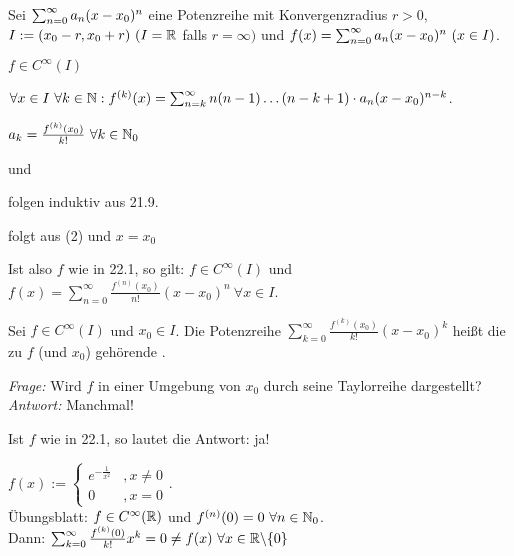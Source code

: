 \documentclass[a4paper,oneside,DIV15,BCOR12mm]{scrbook}
\begin{document}
\begin{satz}
Sei $\sum_{n=0}^{\infty}{a_n(x-x_0)^n}$ eine Potenzreihe mit Konvergenzradius $r>0$, $I:= (x_0-r,x_0+r)\ (I=\mathbb{R}$ falls $r=\infty)$ und $f(x) = \sum_{n=0}^{\infty}{a_n(x-x_0)^n}\ (x\in I)$.
\begin{liste}
\item $f\in C^\infty(I)$
\item $\forall x \in I\ \forall k\in\mathbb{N}: f^{(k)}(x) = \sum_{n=k}^\infty n(n-1)\ldots(n-k+1)\cdot a_n(x-x_0)^{n-k}$.
\item $a_k = \frac{f^{(k)}(x_0)}{k!} \ \forall k \in \mathbb{N}_0$
\end{liste}
\end{satz}

\begin{beweise}
\item und
\item folgen induktiv aus 21.9.
\item folgt aus (2) und $x=x_0$
\end{beweise}

\begin{motivation}
Ist also $f$ wie in 22.1, so gilt: $f\in C^\infty(I)$ und $f(x)=\sum_{n=0}^\infty \frac{f^{(n)}(x_0)}{n!}(x-x_0)^n \ \forall x \in I$.
\end{motivation}

\begin{definition}
Sei $f\in C^\infty(I)$ und $x_0 \in I$. Die Potenzreihe $\sum_{k=0}^\infty \frac{f^{(k)}(x_0)}{k!}(x-x_0)^k$ heißt die zu $f$ (und $x_0$) gehörende .
\end{definition}

\begin{motivation}
\emph{Frage:} Wird $f$ in einer Umgebung von $x_0$ durch seine Taylorreihe dargestellt? \\
\emph{Antwort:} Manchmal!
\end{motivation}

\begin{beispiele}
\item Ist $f$ wie in 22.1, so lautet die Antwort: ja!
\item $f(x):= \begin{cases} e^{-\frac{1}{x^2}} &, x\ne0 \\ 0 &, x= 0\end{cases}$. \\
Übungsblatt: $f \in C^\infty(\mathbb{R})$ und $f^{(n)}(0)=0\ \forall n\in\mathbb{N}_0$. \\
Dann: $\sum_{k=0}^\infty \frac{f^{(k)}(0)}{k!}x^k = 0 \ne f(x) \ \forall x\in\mathbb{R}\backslash\{0\}$
\end{beispiele}
\end{document}

